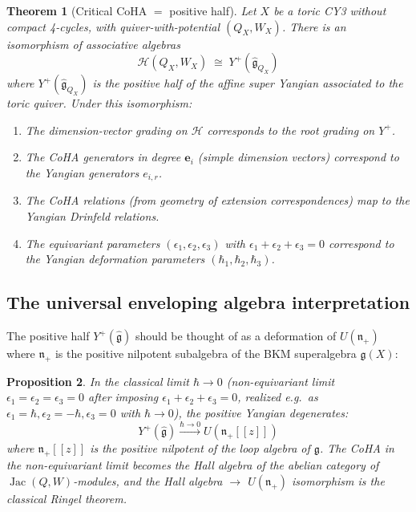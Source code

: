\documentclass[11pt]{article}
\newtheorem{theorem}{Theorem}[section]
\newtheorem{proposition}[theorem]{Proposition}
\theoremstyle{definition}
\theoremstyle{remark}
\newcommand{\CoHA}{\mathcal{H}}
\newcommand{\frakg}{\mathfrak{g}}
\newcommand{\frakn}{\mathfrak{n}}
\begin{document}
\begin{theorem}[Critical CoHA $=$ positive half]
\label{thm:coha-positive-half}
Let $X$ be a toric CY3 without compact 4-cycles, with quiver-with-potential
$(Q_X, W_X)$. There is an isomorphism of associative algebras
\[
 \boxed{\CoHA(Q_X, W_X) \;\cong\; Y^+(\widehat{\frakg}_{Q_X})}
\]
where $Y^+(\widehat{\frakg}_{Q_X})$ is the positive half of the affine super
Yangian associated to the toric quiver. Under this isomorphism:
\begin{enumerate}[label=(\roman*)]
 \item The dimension-vector grading on $\CoHA$ corresponds to the root grading
 on $Y^+$.
 \item The CoHA generators in degree $\mathbf{e}_i$ (simple dimension vectors)
 correspond to the Yangian generators $e_{i,r}$.
 \item The CoHA relations (from geometry of extension correspondences) map to
 the Yangian Drinfeld relations.
 \item The equivariant parameters $(\epsilon_1, \epsilon_2, \epsilon_3)$ with
 $\epsilon_1 + \epsilon_2 + \epsilon_3 = 0$ correspond to the Yangian
 deformation parameters $(\hbar_1, \hbar_2, \hbar_3)$.
\end{enumerate}
\end{theorem}


\subsection{The universal enveloping algebra interpretation}
\label{subsec:uea}

The positive half $Y^+(\widehat{\frakg})$ should be thought of as a deformation
of $U(\frakn_+)$ where $\frakn_+$ is the positive nilpotent subalgebra of the
BKM superalgebra $\frakg(X)$:

\begin{proposition}
\label{prop:classical-limit}
In the classical limit $\hbar \to 0$ (non-equivariant limit $\epsilon_1 = \epsilon_2
= \epsilon_3 = 0$ after imposing $\epsilon_1 + \epsilon_2 + \epsilon_3 = 0$,
realized e.g.\ as $\epsilon_1 = \hbar, \epsilon_2 = -\hbar, \epsilon_3 = 0$
with $\hbar \to 0$), the positive Yangian degenerates:
\[
 Y^+(\widehat{\frakg}) \xrightarrow{\hbar \to 0} U(\frakn_+[\![z]\!])
\]
where $\frakn_+[\![z]\!]$ is the positive nilpotent of the loop algebra of $\frakg$.
The CoHA in the non-equivariant limit becomes the Hall algebra of the abelian
category of $\operatorname{Jac}(Q,W)$-modules, and the Hall algebra
$\to$ $U(\frakn_+)$ isomorphism is the classical Ringel theorem.
\end{proposition}
\end{document}
